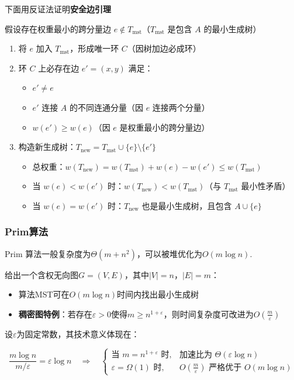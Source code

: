 \documentclass[./../main.tex]{subfiles}
\begin{document}
下面用反证法证明\textbf{安全边引理}

假设存在权重最小的跨分量边 $e \notin T_{\text{mst}}$（$T_{\text{mst}}$ 是包含 $A$ 的最小生成树）

\begin{enumerate}
    \item 将 $e$ 加入 $T_{\text{mst}}$，形成唯一环 $C$（因树加边必成环）
    
    \item 环 $C$ 上必存在边 $e' = (x, y)$ 满足：
    \begin{itemize}
        \item $e' \neq e$
        \item $e'$ 连接 $A$ 的不同连通分量（因 $e$ 连接两个分量）
        \item $w(e') \geq w(e)$（因 $e$ 是权重最小的跨分量边）
    \end{itemize}
    
    \item 构造新生成树：$T_{\text{new}} = T_{\text{mst}} \cup \{e\} \setminus \{e'\}$
    \begin{itemize}
        \item 总权重：$w(T_{\text{new}}) = w(T_{\text{mst}}) + w(e) - w(e') \leq w(T_{\text{mst}})$
        \item 当 $w(e) < w(e')$ 时：$w(T_{\text{new}}) < w(T_{\text{mst}})$（与 $T_{\text{mst}}$ 最小性矛盾）
        \item 当 $w(e) = w(e')$ 时：$T_{\text{new}}$ 也是最小生成树，且包含 $A \cup \{e\}$
    \end{itemize}
\end{enumerate}

\subsubsection{Prim算法}
Prim 算法一般复杂度为$\Theta(m+n^2)$，可以被堆优化为$O(m\log n)$.

给出一个含权无向图$G=(V,E)$，其中$|V|=n$，$|E|=m$：
\begin{itemize}
    \item 算法MST可在$O(m\log n)$时间内找出最小生成树
    \item \textbf{稠密图特例}：若存在$\varepsilon>0$使得$m\geq n^{1+\varepsilon}$，则时间复杂度可改进为$O\left(\frac{m}{\varepsilon}\right)$
\end{itemize}


设$\varepsilon$为固定常数，其技术意义体现在：

\begin{equation}
    \frac{m\log n}{m/\varepsilon} = \varepsilon\log n \quad \Rightarrow \quad 
    \begin{cases}
        \text{当 } m=n^{1+\varepsilon} \text{ 时}, & \text{加速比为 } \Theta(\varepsilon\log n) \\
        \varepsilon=\Omega(1) \text{ 时}, & O\left(\frac{m}{\varepsilon}\right) \text{ 严格优于 } O(m\log n)
    \end{cases}
\end{equation}
\end{document}
